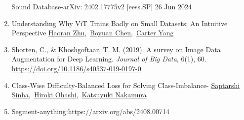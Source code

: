 \begin{enumerate}
  Sound Database-arXiv: 2402.17775v2 {[}eess.SP{]} 26 Jun 2024
\item
  Understanding Why ViT Trains Badly on Small Datasets: An Intuitive
  Perspective
  \href{https://arxiv.org/search/cs?searchtype=author&query=Zhu,+H}{Haoran
  Zhu},~\href{https://arxiv.org/search/cs?searchtype=author&query=Chen,+B}{Boyuan
  Chen},~\href{https://arxiv.org/search/cs?searchtype=author&query=Yang,+C}{Carter
  Yang}
\item
  Shorten, C., \& Khoshgoftaar, T. M. (2019). A survey on Image Data
  Augmentation for Deep Learning. \emph{Journal of Big Data}, 6(1), 60.
  \url{https://doi.org/10.1186/s40537-019-0197-0}\hspace{0pt}\href{https://journalofbigdata.springeropen.com/articles/10.1186/s40537-019-0197-0?utm_source=chatgpt.com}{}
\item
  Class-Wise Difficulty-Balanced Loss for Solving Class-Imbalance-
  \href{https://arxiv.org/search/cs?searchtype=author&query=Sinha,+S}{Saptarshi
  Sinha},~\href{https://arxiv.org/search/cs?searchtype=author&query=Ohashi,+H}{Hiroki
  Ohashi},~\href{https://arxiv.org/search/cs?searchtype=author&query=Nakamura,+K}{Katsuyuki
  Nakamura}
\item
  Segment-anything:https://arxiv.org/abs/2408.00714
\end{enumerate}

